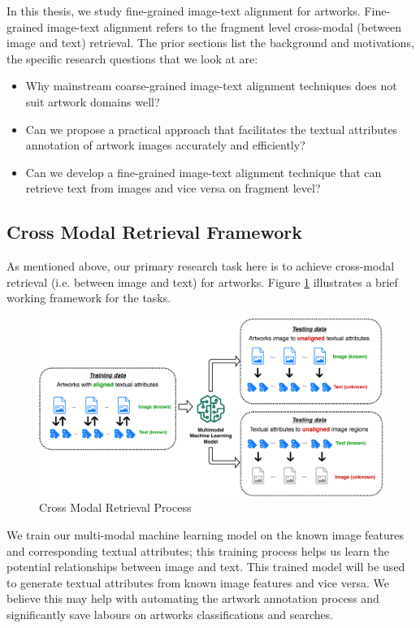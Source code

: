 In this thesis, we study fine-grained image-text alignment for artworks. Fine-grained image-text alignment refers to the fragment level cross-modal (between image and text) retrieval. The prior sections list the background and motivations, the specific research questions that we look at are:

\begin{itemize}
    \item Why mainstream coarse-grained image-text alignment techniques does not suit artwork domains well?
    \item Can we propose a practical approach that facilitates the textual attributes annotation of artwork images accurately and efficiently?
    \item Can we develop a fine-grained image-text alignment technique that can retrieve text from images and vice versa on fragment level?
\end{itemize}

\subsection{Cross Modal Retrieval Framework}

As mentioned above, our primary research task here is to achieve cross-modal retrieval (i.e. between image and text) for artworks. Figure \ref{fig:framework} illustrates a brief working framework for the tasks.

\begin{figure}[h!]
\centering
\includegraphics[width=\textwidth]{framework.pdf}
\caption{Cross Modal Retrieval Process}
\label{fig:framework}
\end{figure}

We train our multi-modal machine learning model on the known image features and corresponding textual attributes; this training process helps us learn the potential relationships between image and text. This trained model will be used to generate textual attributes from known image features and vice versa. We believe this may help with automating the artwork annotation process and significantly save labours on artworks classifications and searches.


